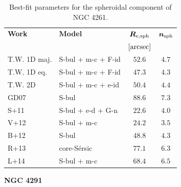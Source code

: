 \documentclass[preprint2]{emulateapj}
\begin{document}
  \begin{table}[h]
  \small
  \caption{Best-fit parameters for the spheroidal component of NGC 4261.}
  \begin{center}
  \begin{tabular}{llcc}
  \hline
  {\bf Work} & {\bf Model}   & $\bm R_{\rm e,sph}$    & $\bm n_{\rm sph}$ \\
    &  &  $[\rm arcsec]$ & \\
  \hline
  T.W. 1D maj. & S-bul + m-c + F-id & $52.6$  &  $4.7$ \\
  T.W. 1D eq.  & S-bul + m-c + F-id & $47.3$  &  $4.3$ \\
  T.W. 2D      & S-bul + m-c + e-id & $50.4$  &  $4.4$ \\
  \hline
  GD07      & S-bul		& $88.6$  &  $7.3$ \\
  S+11      & S-bul + e-d + G-n & $22.6$  &  $4.0$ \\
  V+12      & S-bul + m-c	& $24.2$  &  $3.5$ \\
  B+12      & S-bul		& $48.8$  &  $4.3$ \\
  R+13      & core-S\'ersic	& $77.1$  &  $6.3$ \\
  L+14      & S-bul + m-c	& $68.4$  &  $6.5$ \\
  \hline
  \end{tabular}
  \end{center}
  \label{tab:n4261}
  \end{table}

  \clearpage\newpage\noindent
  {\bf NGC 4291 \\}
\end{document}
